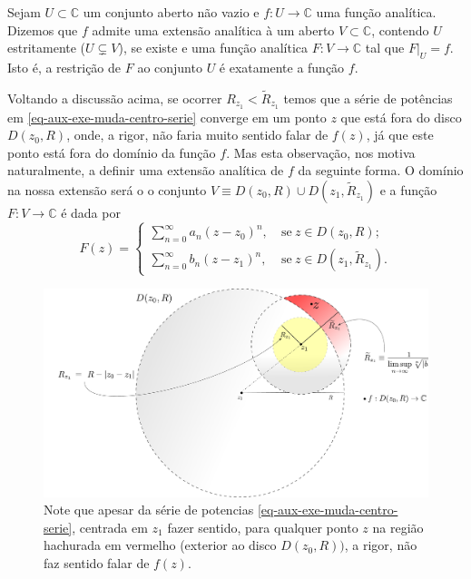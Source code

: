\begin{definicao}
\label{def-ext-analitica}
Sejam $U\subset\mathbb{C}$ um conjunto aberto não vazio e
$f:U\to\mathbb{C}$ uma função analítica. Dizemos que $f$ admite
uma extensão analítica à um aberto $V\subset \mathbb{C}$,
contendo $U$ estritamente ($U\subsetneq V$), se existe e uma função analítica $F:V\to\mathbb{C}$ 
tal que $F|_{U}= f$. Isto é, a restrição de $F$ ao conjunto $U$ 
é exatamente a função $f$. 
\end{definicao}


Voltando a discussão acima, se ocorrer $R_{z_1} < \widetilde{R}_{z_1}$
temos que a série de potências em \eqref{eq-aux-exe-muda-centro-serie} 
converge em um ponto $z$ que está
fora do disco $D(z_0,R)$, onde, a rigor, não faria muito sentido falar
de $f(z)$, já que este ponto está fora do domínio da função $f$.
Mas esta observação, nos motiva naturalmente, a definir uma extensão 
analítica de $f$ da seguinte forma. O domínio na nossa extensão será o 
o conjunto $V \equiv D(z_0,R)\cup D(z_1,\widetilde{R}_{z_1})$ e a função
$F:V\to\mathbb{C}$ é dada por 
\[
F(z)
=
\begin{cases}
\displaystyle\sum_{n=0}^{\infty}a_n(z-z_0)^n,&\ \text{se}\ z\in D(z_0,R);
\\[0.9cm]
\displaystyle\sum_{n=0}^{\infty}b_n(z-z_1)^n,&\ \text{se}\ z\in D(z_1,\widetilde{R}_{z_1}).  
\end{cases}
\]

\bigskip 

\begin{figure}[H]
\centering
\includegraphics[width=0.95\linewidth]{Figuras/Raio-func-analitica-muda-centro}
\caption{Note que apesar da série de potencias \eqref{eq-aux-exe-muda-centro-serie}, 
centrada em $z_1$ fazer sentido, para qualquer ponto $z$ na região hachurada em vermelho (exterior ao disco $D(z_0,R))$, a rigor, não faz sentido falar de $f(z)$.}
\label{fig:raio-func-analitica-muda-centro}
\end{figure}


